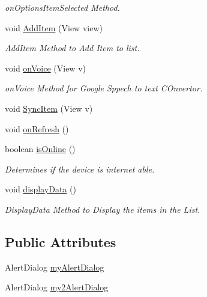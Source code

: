 \begin{DoxyCompactItemize}
\begin{DoxyCompactList}\small\item\em on\+Options\+Item\+Selected Method. \end{DoxyCompactList}\item 
void \hyperlink{classcom_1_1example_1_1santh_1_1shoppinglist_1_1_main_activity_a5b3287fe98bd894937f65cac53aff2f3}{Add\+Item} (View view)
\begin{DoxyCompactList}\small\item\em Add\+Item Method to Add Item to list. \end{DoxyCompactList}\item 
void \hyperlink{classcom_1_1example_1_1santh_1_1shoppinglist_1_1_main_activity_a91d4c9445e987d01d26388181ac32a05}{on\+Voice} (View v)
\begin{DoxyCompactList}\small\item\em on\+Voice Method for Google Sppech to text C\+Onvertor. \end{DoxyCompactList}\item 
void \hyperlink{classcom_1_1example_1_1santh_1_1shoppinglist_1_1_main_activity_a8bfe7142d15e2e78fae9d170da7ae957}{Sync\+Item} (View v)
\item 
void \hyperlink{classcom_1_1example_1_1santh_1_1shoppinglist_1_1_main_activity_a3e4a4b436403fae75ebd98e7f09e230c}{on\+Refresh} ()
\item 
boolean \hyperlink{classcom_1_1example_1_1santh_1_1shoppinglist_1_1_main_activity_aea1441c8e73d0be6fed11c9de2bfa292}{is\+Online} ()
\begin{DoxyCompactList}\small\item\em Determines if the device is internet able. \end{DoxyCompactList}\item 
void \hyperlink{classcom_1_1example_1_1santh_1_1shoppinglist_1_1_main_activity_aea3a89ba2624eed1de56c23664d88ecd}{display\+Data} ()
\begin{DoxyCompactList}\small\item\em Display\+Data Method to Display the items in the List. \end{DoxyCompactList}\end{DoxyCompactItemize}
\subsection*{Public Attributes}
\begin{DoxyCompactItemize}
\item 
Alert\+Dialog \hyperlink{classcom_1_1example_1_1santh_1_1shoppinglist_1_1_main_activity_ab059477f916af817596e0bd4f3f54e29}{my\+Alert\+Dialog}
\item 
Alert\+Dialog \hyperlink{classcom_1_1example_1_1santh_1_1shoppinglist_1_1_main_activity_ae4005027b424faa89a6c20dbf4522901}{my2\+Alert\+Dialog}
\end{DoxyCompactItemize}

